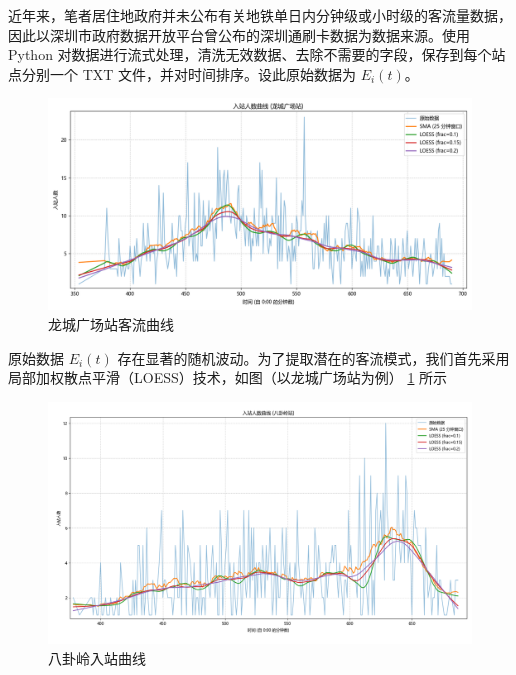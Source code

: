 

近年来，笔者居住地政府并未公布有关地铁单日内分钟级或小时级的客流量数据，因此以深圳市政府数据开放平台曾公布的深圳通刷卡数据为数据来源。使用 Python 对数据进行流式处理，清洗无效数据、去除不需要的字段，保存到每个站点分别一个 TXT 文件，并对时间排序。设此原始数据为 $E_i(t)$。

\begin{figure}[htbp]
    \centering
    \includegraphics[width=1.0\textwidth]{res/Figure_1.png}
    \caption{龙城广场站客流曲线}
    \label{fig:entryCurveLongcheng}
\end{figure}

原始数据 $E_i(t)$ 存在显著的随机波动。为了提取潜在的客流模式，我们首先采用局部加权散点平滑（LOESS）\cite{1979LOESS}\cite{1988LOESS}技术，如图（以龙城广场站为例） \ref{fig:entryCurveLongcheng} 所示

\begin{figure}[htbp]
    \centering
    \includegraphics[width=1.0\textwidth]{res/Figure_2.png}
    \caption{八卦岭入站曲线}
    \label{fig:entryCurveBagualing}
\end{figure}

